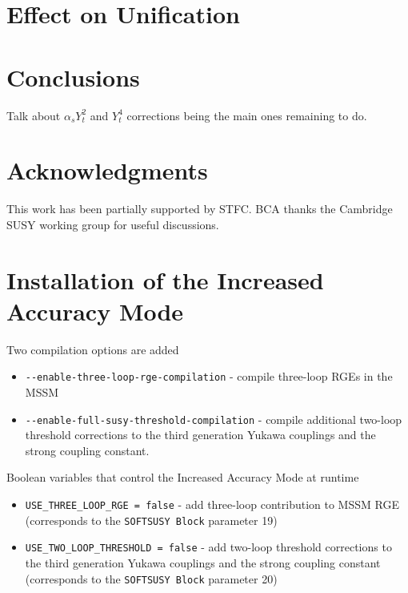 \documentclass[final,3p,times,pdflatex]{elsarticle}
\def\code#1{\small{\tt #1}\normalsize}
\begin{document}
\section{Effect on Unification}

\section{Conclusions}
Talk about $\alpha_s Y_t^2$ and $Y_t^4$ corrections being the main ones
remaining to do.  

\section*{Acknowledgments}
This work has been partially supported by STFC. BCA thanks the Cambridge SUSY
working group for useful discussions.

\appendix

\section{Installation of the Increased Accuracy Mode}
\label{sec:install}

Two compilation options are added
\begin{itemize}
	\item[] \verb|--enable-three-loop-rge-compilation| - compile three-loop RGEs in the MSSM 
	\item[] \verb|--enable-full-susy-threshold-compilation| - compile
          additional two-loop threshold corrections to the third generation
          Yukawa couplings and the strong coupling constant.
\end{itemize}

Boolean variables that control the Increased Accuracy Mode at runtime
\begin{itemize}
	\item \verb|USE_THREE_LOOP_RGE = false|  - add three-loop contribution to MSSM RGE (corresponds to the \code{SOFTSUSY Block} parameter 19)
	\item \verb|USE_TWO_LOOP_THRESHOLD = false| - add two-loop threshold corrections to the third generation Yukawa couplings and the strong coupling constant
(corresponds to the \code{SOFTSUSY Block} parameter 20)
\end{itemize}
\end{document}
